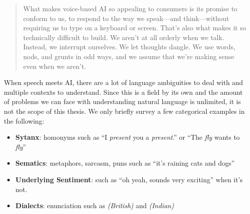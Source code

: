 \begin{quotation}
What makes voice-based AI so appealing to consumers is its promise to conform to us, to respond to the way we speak—and think—without requiring us to type on a keyboard or screen. That's also what makes it so technically difficult to build. We aren't at all orderly when we talk. Instead, we interrupt ourselves. We let thoughts dangle. We use words, nods, and grunts in odd ways, and we assume that we're making sense even when we aren't. \cite{mit:Alexa}
\end{quotation}

When speech meets AI, there are a lot of language ambiguities to deal with and multiple contexts to understand. Since this is a field by its own and the amount of problems we can face with understanding natural language is unlimited, it is not the scope of this thesis. We only briefly survey a few categorical examples in the following:
\begin{itemize}
	\item \textbf{Sytanx}: homonyms such as ``I \textit{present} you a \textit{present}.'' or ``The \textit{fly} wants to \textit{fly}''
	
	\item \textbf{Sematics}: metaphors, sarcasm, puns such as ``it's raining cats and dogs''
	
	\item \textbf{Underlying Sentiment}: such as ``oh yeah, sounds very exciting'' when it's not.
	
	\item \textbf{Dialects}: enunciation such as \textipa{[dI"vE|9pm9nt]} \textit{(British)} and \textipa{[d9v"|Apm9nt]} \textit{(Indian)}

\end{itemize}

%
%	
%


